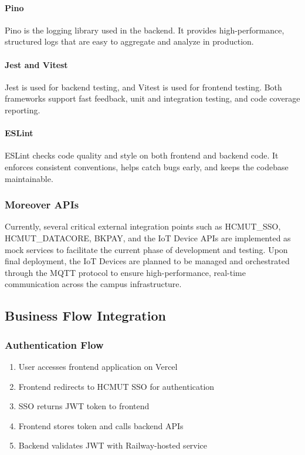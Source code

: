 \paragraph{Pino}
Pino is the logging library used in the backend. It provides high-performance, structured logs that are easy to aggregate and analyze in production.

\paragraph{Jest and Vitest}
Jest is used for backend testing, and Vitest is used for frontend testing. Both frameworks support fast feedback, unit and integration testing, and code coverage reporting.

\paragraph{ESLint}
ESLint checks code quality and style on both frontend and backend code. It enforces consistent conventions, helps catch bugs early, and keeps the codebase maintainable.

\subsubsection{Moreover APIs}
Currently, several critical external integration points such as HCMUT\_SSO, HCMUT\_DATACORE, BKPAY, and the IoT Device APIs are implemented as mock services to facilitate the current phase of development and testing. Upon final deployment, the IoT Devices are planned to be managed and orchestrated through the MQTT protocol to ensure high-performance, real-time communication across the campus infrastructure.

\subsection{Business Flow Integration}

\subsubsection{Authentication Flow}
\begin{enumerate}
\item User accesses frontend application on Vercel
\item Frontend redirects to HCMUT SSO for authentication
\item SSO returns JWT token to frontend
\item Frontend stores token and calls backend APIs
\item Backend validates JWT with Railway-hosted service
\end{enumerate}

